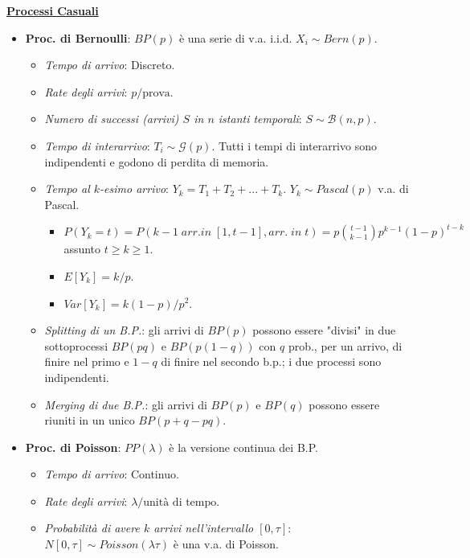 \documentclass[8pt]{extarticle}
\begin{document}
\begin{multicols*}{3}
    \textbf{\underline{Processi Casuali}}
    \begin{itemize}
        \item \textbf{Proc. di Bernoulli}: $BP(p)$ è una serie di v.a. i.i.d. $X_{i}\sim Bern(p)$.
              \begin{itemize}
                  \item \textit{Tempo di arrivo}: Discreto.
                  \item \textit{Rate degli arrivi}: $p/\text{prova}$.
                  \item \textit{Numero di successi (arrivi) $S$ in $n$ istanti temporali}: $S\sim\mathcal{B}(n,p)$.
                  \item \textit{Tempo di interarrivo}: $T_{i}\sim\mathcal{G}(p)$. Tutti i tempi di interarrivo sono indipendenti e godono di perdita di memoria.
                  \item \textit{Tempo al $k$-esimo arrivo}: $Y_{k}=T_{1}+T_{2}+...+T_{k}$. $Y_{k}\sim Pascal(p)$ v.a. di Pascal.
                        \begin{itemize}
                            \item $P(Y_{k}=t)=P(k-1\; arr. in\; [1, t-1], arr.\; in\; t)=p\binom{t-1}{k-1}p^{k-1}(1-p)^{t-k}$ assunto $t\ge k\ge 1$.
                            \item $E[Y_{k}]=k/p$.
                            \item $Var[Y_{k}]=k(1-p)/p^{2}$.
                        \end{itemize}
                  \item \textit{Splitting di un B.P.}: gli arrivi di $BP(p)$ possono essere "divisi" in due sottoprocessi $BP(pq)$ e $BP(p(1-q))$ con $q$ prob., per un arrivo, di finire nel primo e $1-q$ di finire nel secondo b.p.; i due processi sono indipendenti.
                  \item \textit{Merging di due B.P.}: gli arrivi di $BP(p)$ e $BP(q)$ possono essere riuniti in un unico $BP(p+q-pq)$.
              \end{itemize}
        \item \textbf{Proc. di Poisson}: $PP(\lambda)$ è la versione continua dei B.P.
              \begin{itemize}
                  \item \textit{Tempo di arrivo}: Continuo.
                  \item \textit{Rate degli arrivi}: $\lambda/\text{unità di tempo}$.
                  \item \textit{Probabilità di avere $k$ arrivi nell'intervallo $[0, \tau]$}:  $N[0, \tau]\sim Poisson(\lambda\tau)$ è una v.a. di Poisson.

\end{itemize}
\end{itemize}
\end{multicols*}
\end{document}

